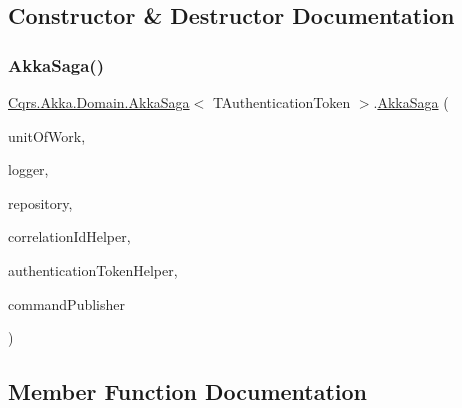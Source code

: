 \subsection{Constructor \& Destructor Documentation}
\mbox{\label{classCqrs_1_1Akka_1_1Domain_1_1AkkaSaga_a2f0ebb5d1d22e3112d5b9a09fde7fb47_a2f0ebb5d1d22e3112d5b9a09fde7fb47}} 
\subsubsection{\texorpdfstring{Akka\+Saga()}{AkkaSaga()}}
{\footnotesize\ttfamily \hyperlink{classCqrs_1_1Akka_1_1Domain_1_1AkkaSaga}{Cqrs.\+Akka.\+Domain.\+Akka\+Saga}$<$ T\+Authentication\+Token $>$.\hyperlink{classCqrs_1_1Akka_1_1Domain_1_1AkkaSaga}{Akka\+Saga} (\begin{DoxyParamCaption}\item[{\hyperlink{interfaceCqrs_1_1Domain_1_1ISagaUnitOfWork}{I\+Saga\+Unit\+Of\+Work}$<$ T\+Authentication\+Token $>$}]{unit\+Of\+Work,  }\item[{I\+Logger}]{logger,  }\item[{\hyperlink{interfaceCqrs_1_1Akka_1_1Domain_1_1IAkkaSagaRepository}{I\+Akka\+Saga\+Repository}$<$ T\+Authentication\+Token $>$}]{repository,  }\item[{I\+Correlation\+Id\+Helper}]{correlation\+Id\+Helper,  }\item[{\hyperlink{interfaceCqrs_1_1Authentication_1_1IAuthenticationTokenHelper}{I\+Authentication\+Token\+Helper}$<$ T\+Authentication\+Token $>$}]{authentication\+Token\+Helper,  }\item[{\hyperlink{interfaceCqrs_1_1Commands_1_1ICommandPublisher}{I\+Command\+Publisher}$<$ T\+Authentication\+Token $>$}]{command\+Publisher }\end{DoxyParamCaption})\hspace{0.3cm}{\ttfamily [protected]}}



\subsection{Member Function Documentation}
\mbox{\label{classCqrs_1_1Akka_1_1Domain_1_1AkkaSaga_a4a12310825f2d2cc5963eee4cc4ed802_a4a12310825f2d2cc5963eee4cc4ed802}} 

